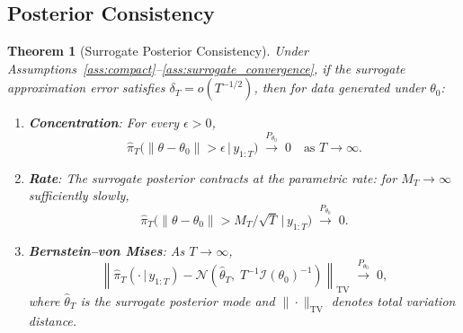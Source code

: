 \documentclass[12pt]{article}
\theoremstyle{plain}
\newtheorem{theorem}{Theorem}[section]
\theoremstyle{definition}
\theoremstyle{remark}
\newcommand{\given}{\,|\,}
\begin{document}
\subsection{Posterior Consistency}

\begin{theorem}[Surrogate Posterior Consistency]
\label{thm:posterior_consistency}
Under Assumptions~\ref{ass:compact}--\ref{ass:surrogate_convergence}, if the surrogate approximation error satisfies $\delta_T = o(T^{-1/2})$, then for data generated under $\theta_0$:
\begin{enumerate}[label=(\roman*)]
\item \textbf{Concentration}: For every $\epsilon > 0$,
\[
\hat{\pi}_T\!\bigl(\|\theta - \theta_0\| > \epsilon \given y_{1:T}\bigr)
  \;\xrightarrow{P_{\theta_0}}\; 0
  \quad \text{as } T \to \infty.
\]
\item \textbf{Rate}: The surrogate posterior contracts at the parametric rate: for $M_T \to \infty$ sufficiently slowly,
\[
\hat{\pi}_T\!\bigl(\|\theta - \theta_0\| > M_T / \sqrt{T} \given
  y_{1:T}\bigr) \;\xrightarrow{P_{\theta_0}}\; 0.
\]
\item \textbf{Bernstein--von Mises}: As $T \to \infty$,
\[
\left\| \hat{\pi}_T(\cdot \given y_{1:T}) -
  \mathcal{N}\!\left(\hat{\theta}_T,\;
    T^{-1}\mathcal{I}(\theta_0)^{-1}\right) \right\|_{\text{TV}}
  \;\xrightarrow{P_{\theta_0}}\; 0,
\]
where $\hat{\theta}_T$ is the surrogate posterior mode and $\|\cdot\|_{\text{TV}}$ denotes total variation distance.
\end{enumerate}
\end{theorem}
\end{document}
